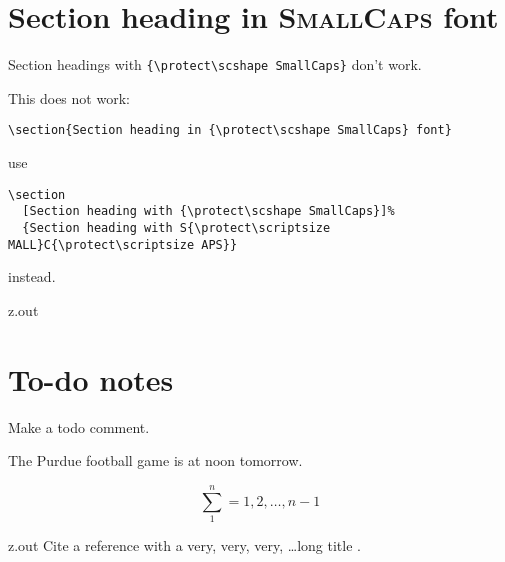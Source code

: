 \MyIO


\section{Section heading in {\protect\scshape SmallCaps} font}
\label{section-headings-with-smallcaps-font}

Section headings with \verb+{\protect\scshape SmallCaps}+ don't work.%

\mbox{}


This does not work:
\begin{verbatim}
\section{Section heading in {\protect\scshape SmallCaps} font}
\end{verbatim}
use
\begin{verbatim}
\section
  [Section heading with {\protect\scshape SmallCaps}]%
  {Section heading with S{\protect\scriptsize MALL}C{\protect\scriptsize APS}}
\end{verbatim}
instead.


\begin{VerbatimOut}{z.out}


\section{To-do notes}

Make a todo comment.%

The Purdue football game is at noon tomorrow.%

\[
  \sum_1^n = 1, 2, \ldots, n - 1
\]%
\end{VerbatimOut}

\MyIO


\begin{VerbatimOut}{z.out}
Cite a reference with a very, very, very, \ldots long title
\cite{test-long-title}.
\end{VerbatimOut}

